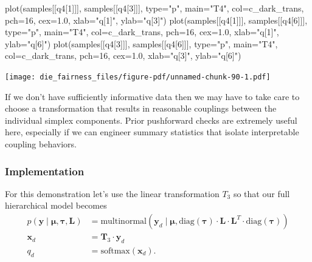 \documentclass[
  letterpaper,
  DIV=11,
  numbers=noendperiod]{scrartcl}
\newenvironment{Shaded}{\begin{snugshade}}{\end{snugshade}}
\newcommand{\AttributeTok}[1]{\textcolor[rgb]{0.40,0.45,0.13}{#1}}
\newcommand{\DecValTok}[1]{\textcolor[rgb]{0.68,0.00,0.00}{#1}}
\newcommand{\FloatTok}[1]{\textcolor[rgb]{0.68,0.00,0.00}{#1}}
\newcommand{\FunctionTok}[1]{\textcolor[rgb]{0.28,0.35,0.67}{#1}}
\newcommand{\NormalTok}[1]{\textcolor[rgb]{0.00,0.23,0.31}{#1}}
\newcommand{\StringTok}[1]{\textcolor[rgb]{0.13,0.47,0.30}{#1}}
\begin{document}
\begin{Shaded}
\begin{Highlighting}[]
\FunctionTok{plot}\NormalTok{(samples[[}\StringTok{\textquotesingle{}q4[1]\textquotesingle{}}\NormalTok{]], samples[[}\StringTok{\textquotesingle{}q4[3]\textquotesingle{}}\NormalTok{]], }\AttributeTok{type=}\StringTok{"p"}\NormalTok{,}
     \AttributeTok{main=}\StringTok{"T4"}\NormalTok{, }\AttributeTok{col=}\NormalTok{c\_dark\_trans, }\AttributeTok{pch=}\DecValTok{16}\NormalTok{, }\AttributeTok{cex=}\FloatTok{1.0}\NormalTok{,}
     \AttributeTok{xlab=}\StringTok{"q[1]"}\NormalTok{, }\AttributeTok{ylab=}\StringTok{"q[3]"}\NormalTok{)}
\FunctionTok{plot}\NormalTok{(samples[[}\StringTok{\textquotesingle{}q4[1]\textquotesingle{}}\NormalTok{]], samples[[}\StringTok{\textquotesingle{}q4[6]\textquotesingle{}}\NormalTok{]], }\AttributeTok{type=}\StringTok{"p"}\NormalTok{,}
     \AttributeTok{main=}\StringTok{"T4"}\NormalTok{, }\AttributeTok{col=}\NormalTok{c\_dark\_trans, }\AttributeTok{pch=}\DecValTok{16}\NormalTok{, }\AttributeTok{cex=}\FloatTok{1.0}\NormalTok{,}
     \AttributeTok{xlab=}\StringTok{"q[1]"}\NormalTok{, }\AttributeTok{ylab=}\StringTok{"q[6]"}\NormalTok{)}
\FunctionTok{plot}\NormalTok{(samples[[}\StringTok{\textquotesingle{}q4[3]\textquotesingle{}}\NormalTok{]], samples[[}\StringTok{\textquotesingle{}q4[6]\textquotesingle{}}\NormalTok{]], }\AttributeTok{type=}\StringTok{"p"}\NormalTok{,}
     \AttributeTok{main=}\StringTok{"T4"}\NormalTok{, }\AttributeTok{col=}\NormalTok{c\_dark\_trans, }\AttributeTok{pch=}\DecValTok{16}\NormalTok{, }\AttributeTok{cex=}\FloatTok{1.0}\NormalTok{,}
     \AttributeTok{xlab=}\StringTok{"q[3]"}\NormalTok{, }\AttributeTok{ylab=}\StringTok{"q[6]"}\NormalTok{)}
\end{Highlighting}
\end{Shaded}

\texttt{[image: die\_fairness\_files/figure-pdf/unnamed-chunk-90-1.pdf]}

If we don't have sufficiently informative data then we may have to take
care to choose a transformation that results in reasonable couplings
between the individual simplex components. Prior pushforward checks are
extremely useful here, especially if we can engineer summary statistics
that isolate interpretable coupling behaviors.

\subsubsection{Implementation}\label{implementation-3}

For this demonstration let's use the linear transformation \(T_{3}\) so
that our full hierarchical model becomes \begin{align*}
p( \mathbf{y} \mid \boldsymbol{\mu}, \boldsymbol{\tau}, \mathbf{L})
&=
\mathrm{multinormal}( \mathbf{y}_{d} \mid
                      \boldsymbol{\mu},
                      \mathrm{diag}(\boldsymbol{\tau}) \cdot
                      \mathbf{L}
                      \cdot \mathbf{L}^{T} \cdot
                      \mathrm{diag}(\boldsymbol{\tau}) )
\\
\mathbf{x}_{d} &= \mathbf{T}_{3} \cdot \mathbf{y}_{d}
\\
q_{d} &= \mathrm{softmax}(\mathbf{x}_{d}).
\end{align*}
\end{document}
